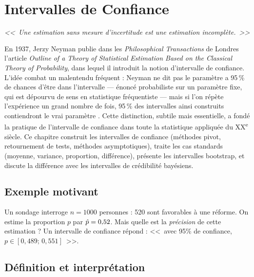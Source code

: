 \chapter{Intervalles de Confiance}
\label{ch:ic}

\begin{center}
\textit{<<~Une estimation sans mesure d'incertitude est une estimation incompl\`ete.~>>}
\end{center}

En 1937, Jerzy Neyman publie dans les \emph{Philosophical Transactions} de Londres l'article \emph{Outline of a Theory of Statistical Estimation Based on the Classical Theory of Probability}, dans lequel il introduit la notion d'intervalle de confiance. L'idée combat un malentendu fréquent : Neyman ne dit pas \og{} le paramètre a 95\,\% de chances d'être dans l'intervalle \fg{} --- énoncé probabiliste sur un paramètre fixe, qui est dépourvu de sens en statistique fréquentiste --- mais \og{} si l'on répète l'expérience un grand nombre de fois, 95\,\% des intervalles ainsi construits contiendront le vrai paramètre \fg{}. Cette distinction, subtile mais essentielle, a fondé la pratique de l'intervalle de confiance dans toute la statistique appliquée du XX\textsuperscript{e} siècle. Ce chapitre construit les intervalles de confiance (méthodes pivot, retournement de tests, méthodes asymptotiques), traite les cas standards (moyenne, variance, proportion, différence), présente les intervalles bootstrap, et discute la différence avec les intervalles de crédibilité bayésiens.

\section{Exemple motivant}

Un sondage interroge $n=1000$ personnes : 520 sont favorables \`a une r\'eforme. On estime la proportion $p$ par $\hat{p}=0{,}52$. Mais quelle est la \emph{pr\'ecision} de cette estimation ? Un intervalle de confiance r\'epond : <<~avec 95\% de confiance, $p\in[0{,}489;\,0{,}551]$~>>.

\section{D\'efinition et interpr\'etation}

